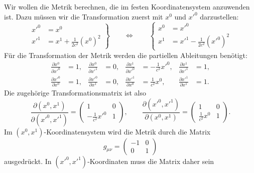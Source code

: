 Wir wollen die Metrik berechnen, die im festen Koordinatensystem
anzuwenden ist. 
Dazu müssen wir die Transformation zuerst mit $x^0$ und $x'^0$ 
darzustellen:
\begin{equation}
\left.
\begin{aligned}
x'^0 &= x^0 \\
x'^1 &= x^1+\frac{1}{2c^2}(x^0)^2
\end{aligned}
\right\}
\qquad
\Leftrightarrow
\qquad
\left\{
\begin{aligned}
x^0 &= x'^0 \\
x^1 &= x'^1 - \frac{1}{2c^2}(x'^0)^2
\end{aligned}
\right.
\end{equation}
Für die Transformation der Metrik werden die partiellen Ableitungen
benötigt:
\begin{equation}
\begin{aligned}
\frac{\partial x^0}{\partial x'^0}&=1,
&
\frac{\partial x^0}{\partial x'^1}&=0,
&
\frac{\partial x^1}{\partial x'^0}&=-\frac{1}{c^2}x'^0,
&
\frac{\partial x^1}{\partial x'^1}&=1,
\\
\frac{\partial x'^0}{\partial x^0}&=1,
&
\frac{\partial x'^0}{\partial x^1}&=0,
&
\frac{\partial x'^1}{\partial x^0}&=\frac{1}{c^2}x^0,
&
\frac{\partial x'^1}{\partial x^1}&=1.
\end{aligned}
\end{equation}
Die zugehörige Transformationsmatrix ist also
\begin{equation}
\frac{\partial (x^0, x^1)}{\partial (x'^0, x'^1)}
=
\begin{pmatrix}
1&0\\
-\frac1{c^2}x'^0&1
\end{pmatrix},
\qquad
\frac{\partial (x'^0, x'^1)}{\partial (x^0, x^1)}
=
\begin{pmatrix}
1&0\\
\frac1{c^2}x^0&1
\end{pmatrix}.
\end{equation}
Im $(x^0,x^1)$-Koordinatensystem wird die Metrik durch die Matrix
\[
g_{\mu\nu}
=
\begin{pmatrix}-1&0\\0&1\end{pmatrix}
\]
ausgedrückt.
In $(x'^0,x'^1)$-Koordinaten muss die Matrix daher sein
